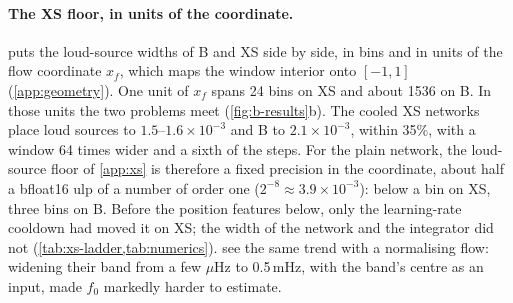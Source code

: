 \paragraph{The XS floor, in units of the coordinate.}
 puts the loud-source widths of B and XS side by side, in bins and in
units of the flow coordinate $x_f$, which maps the window interior onto $[-1,1]$
(\cref{app:geometry}). One unit of $x_f$ spans 24 bins on XS and about 1536 on B. In those
units the two problems meet (\cref{fig:b-results}b). The cooled XS networks place loud
sources to $1.5$--$1.6\times10^{-3}$ and B to $2.1\times10^{-3}$, within 35\%, with a window 64
times wider and a sixth of the steps. For the plain network, the loud-source floor of \cref{app:xs} is therefore a fixed precision in
the coordinate, about half a bfloat16 ulp of a number of order one
($2^{-8}\approx3.9\times10^{-3}$): below a bin on XS, three bins on B. Before the position
features below, only the learning-rate cooldown had moved it on XS; the width of the network
and the integrator did not (\cref{tab:xs-ladder,tab:numerics}). \citet{delmond2026neural} see the same trend with a
normalising flow: widening their band from a few $\mu$Hz to 0.5\,mHz, with the band's centre
as an input, made $f_0$ markedly harder to estimate.

\begin{table}[h]
\caption{The loud-source $f_0$ width ($\snr\ge100$), in bins and in units of the flow
coordinate $x_f$. XS widths are medians over found sources, B's over all sources narrower than
50 bins.}
\label{tab:b-coordinate}
\centering
\small

\end{table}


